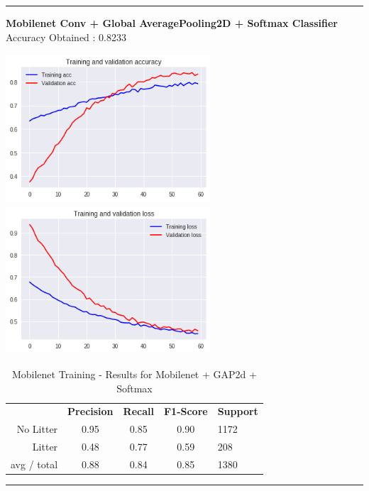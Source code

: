 \documentclass{IEEEtran}
\begin{document}
\begin{center}\noindent\rule{10cm}{0.4pt}\end{center}

\bigskip

\textbf{Mobilenet Conv + Global AveragePooling2D + Softmax Classifier}\newline
Accuracy Obtained : 0.8233

\includegraphics[width=3in,height=2.18in]{mobile/mobilenet-img003.png} 
\includegraphics[width=3in,height=2.18in]{mobile/mobilenet-img004.png} 


\bigskip

\begin{table}[ht]
\centering
\caption{Mobilenet Training - Results for Mobilenet + GAP2d + Softmax}
\label{mobilenet1}
\begin{tabular}{rcccl}
\textbf{}   & \textbf{Precision} & \textbf{Recall} & \textbf{F1-Score} & \textbf{Support} \\
No Litter   & 0.95 &0.85 & 0.90 & 1172 \\
Litter      & 0.48 &0.77 & 0.59 & 208 \\
avg / total & 0.88 &0.84 & 0.85 & 1380 \\
\end{tabular}
\begin{center}\noindent\rule{10cm}{0.4pt}\end{center}
\end{table}
\end{document}
